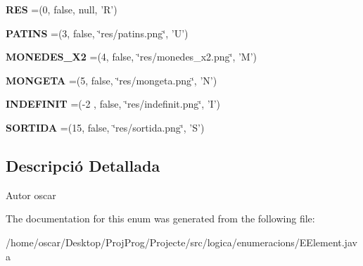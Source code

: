 \begin{DoxyCompactItemize}
\item 
\hypertarget{enumlogica_1_1enumeracions_1_1_e_element_a245e97fd082485340269d8ab61f2b755}{{\bfseries R\+E\+S} =(0, false, null, 'R')}\label{enumlogica_1_1enumeracions_1_1_e_element_a245e97fd082485340269d8ab61f2b755}

\item 
\hypertarget{enumlogica_1_1enumeracions_1_1_e_element_a0a61c21bfec5ae8800427056310419e3}{{\bfseries P\+A\+T\+I\+N\+S} =(3, false, \char`\"{}res/patins.\+png\char`\"{}, 'U')}\label{enumlogica_1_1enumeracions_1_1_e_element_a0a61c21bfec5ae8800427056310419e3}

\item 
\hypertarget{enumlogica_1_1enumeracions_1_1_e_element_a46992bac48ae51860eab0c0943396e3c}{{\bfseries M\+O\+N\+E\+D\+E\+S\+\_\+\+X2} =(4, false, \char`\"{}res/monedes\+\_\+x2.\+png\char`\"{}, 'M')}\label{enumlogica_1_1enumeracions_1_1_e_element_a46992bac48ae51860eab0c0943396e3c}

\item 
\hypertarget{enumlogica_1_1enumeracions_1_1_e_element_a1ecb0f7c24daddf0c76a31d6011d88aa}{{\bfseries M\+O\+N\+G\+E\+T\+A} =(5, false, \char`\"{}res/mongeta.\+png\char`\"{}, 'N')}\label{enumlogica_1_1enumeracions_1_1_e_element_a1ecb0f7c24daddf0c76a31d6011d88aa}

\item 
\hypertarget{enumlogica_1_1enumeracions_1_1_e_element_a662e4647d191a9df383e40bb61c5eb91}{{\bfseries I\+N\+D\+E\+F\+I\+N\+I\+T} =(-\/2 , false, \char`\"{}res/indefinit.\+png\char`\"{}, 'I')}\label{enumlogica_1_1enumeracions_1_1_e_element_a662e4647d191a9df383e40bb61c5eb91}

\item 
\hypertarget{enumlogica_1_1enumeracions_1_1_e_element_ae8aea2c8afbe63876761224cc6db55be}{{\bfseries S\+O\+R\+T\+I\+D\+A} =(15, false, \char`\"{}res/sortida.\+png\char`\"{}, 'S')}\label{enumlogica_1_1enumeracions_1_1_e_element_ae8aea2c8afbe63876761224cc6db55be}

\end{DoxyCompactItemize}


\subsection{Descripció Detallada}
\begin{DoxyAuthor}{Autor}
oscar 
\end{DoxyAuthor}


The documentation for this enum was generated from the following file\+:\begin{DoxyCompactItemize}
\item 
/home/oscar/\+Desktop/\+Proj\+Prog/\+Projecte/src/logica/enumeracions/E\+Element.\+java\end{DoxyCompactItemize}
